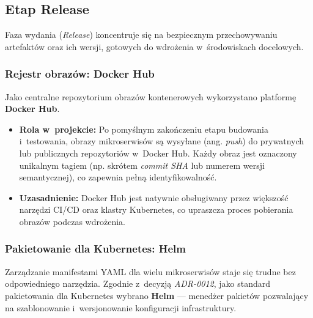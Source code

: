 \subsection{Etap Release}
Faza wydania (\textit{Release}) koncentruje się na bezpiecznym przechowywaniu artefaktów oraz ich wersji, gotowych do wdrożenia w~środowiskach docelowych.

\subsubsection{Rejestr obrazów: Docker Hub}
Jako centralne repozytorium obrazów kontenerowych wykorzystano platformę \textbf{Docker Hub}.
\begin{itemize}
    \item \textbf{Rola w~projekcie:} Po pomyślnym zakończeniu etapu budowania i~testowania, obrazy mikroserwisów są wysyłane (ang. \textit{push}) do prywatnych lub publicznych repozytoriów w~Docker Hub. Każdy obraz jest oznaczony unikalnym tagiem (np. skrótem \textit{commit SHA} lub numerem wersji semantycznej), co zapewnia pełną identyfikowalność.
    \item \textbf{Uzasadnienie:} Docker Hub jest natywnie obsługiwany przez większość narzędzi CI/CD oraz klastry Kubernetes, co upraszcza proces pobierania obrazów podczas wdrożenia.
\end{itemize}

\subsubsection{Pakietowanie dla Kubernetes: Helm}
Zarządzanie manifestami YAML dla wielu mikroserwisów staje się trudne bez odpowiedniego narzędzia. Zgodnie z~decyzją \textit{ADR-0012}, jako standard pakietowania dla Kubernetes wybrano \textbf{Helm} — menedżer pakietów pozwalający na szablonowanie i~wersjonowanie konfiguracji infrastruktury.

